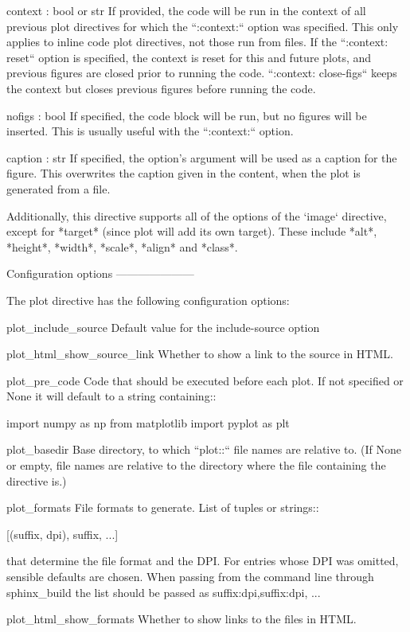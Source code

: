 \begin{DoxyVerb}
    context : bool or str
If provided, the code will be run in the context of all previous plot
directives for which the ``:context:`` option was specified.  This only
applies to inline code plot directives, not those run from files. If
the ``:context: reset`` option is specified, the context is reset
for this and future plots, and previous figures are closed prior to
running the code. ``:context: close-figs`` keeps the context but closes
previous figures before running the code.

    nofigs : bool
If specified, the code block will be run, but no figures will be
inserted.  This is usually useful with the ``:context:`` option.

    caption : str
If specified, the option's argument will be used as a caption for the
figure. This overwrites the caption given in the content, when the plot
is generated from a file.

Additionally, this directive supports all of the options of the `image`
directive, except for *target* (since plot will add its own target).  These
include *alt*, *height*, *width*, *scale*, *align* and *class*.

Configuration options
---------------------

The plot directive has the following configuration options:

    plot_include_source
Default value for the include-source option

    plot_html_show_source_link
Whether to show a link to the source in HTML.

    plot_pre_code
Code that should be executed before each plot. If not specified or None
it will default to a string containing::

    import numpy as np
    from matplotlib import pyplot as plt

    plot_basedir
Base directory, to which ``plot::`` file names are relative
to.  (If None or empty, file names are relative to the
directory where the file containing the directive is.)

    plot_formats
File formats to generate. List of tuples or strings::

    [(suffix, dpi), suffix, ...]

that determine the file format and the DPI. For entries whose
DPI was omitted, sensible defaults are chosen. When passing from
the command line through sphinx_build the list should be passed as
suffix:dpi,suffix:dpi, ...

    plot_html_show_formats
Whether to show links to the files in HTML.


\end{DoxyVerb}
